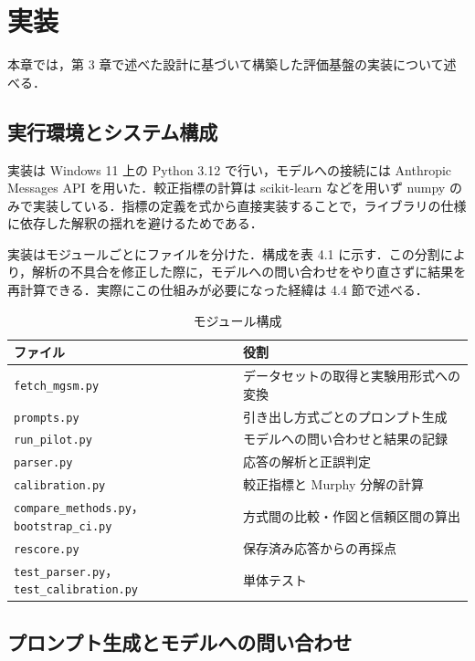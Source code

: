 \chapter{実装}

本章では，第 3 章で述べた設計に基づいて構築した評価基盤の実装について述べる．

\section{実行環境とシステム構成}

実装は Windows 11 上の Python 3.12 で行い，モデルへの接続には Anthropic Messages API を用いた．較正指標の計算は scikit-learn などを用いず numpy のみで実装している．指標の定義を式から直接実装することで，ライブラリの仕様に依存した解釈の揺れを避けるためである．

実装はモジュールごとにファイルを分けた．構成を表 4.1 に示す．この分割により，解析の不具合を修正した際に，モデルへの問い合わせをやり直さずに結果を再計算できる．実際にこの仕組みが必要になった経緯は 4.4 節で述べる．

\begin{table}[htbp]
\centering
\small
\caption{モジュール構成}
\label{tab:4.1}
\begin{tabularx}{\linewidth}{|X|X|}
\hline
ファイル & 役割 \\
\hline
\texttt{fetch\_\allowbreak{}mgsm.\allowbreak{}py} & データセットの取得と実験用形式への変換 \\
\texttt{prompts.\allowbreak{}py} & 引き出し方式ごとのプロンプト生成 \\
\texttt{run\_\allowbreak{}pilot.\allowbreak{}py} & モデルへの問い合わせと結果の記録 \\
\texttt{parser.\allowbreak{}py} & 応答の解析と正誤判定 \\
\texttt{calibration.\allowbreak{}py} & 較正指標と Murphy 分解の計算 \\
\texttt{compare\_\allowbreak{}methods.\allowbreak{}py}，\texttt{bootstrap\_\allowbreak{}ci.\allowbreak{}py} & 方式間の比較・作図と信頼区間の算出 \\
\texttt{rescore.\allowbreak{}py} & 保存済み応答からの再採点 \\
\texttt{test\_\allowbreak{}parser.\allowbreak{}py}，\texttt{test\_\allowbreak{}calibration.\allowbreak{}py} & 単体テスト \\
\hline
\end{tabularx}
\end{table}

\section{プロンプト生成とモデルへの問い合わせ}

